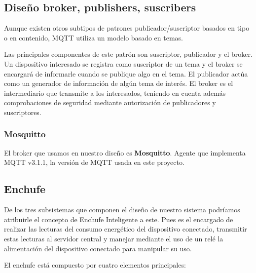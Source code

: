 \documentclass[a4paper,10pt]{article}
\begin{document}
\subsection{Diseño broker, publishers,
suscribers}\label{diseuxf1o-broker-publishers-suscribers}

Aunque existen otros subtipos de patrones publicador/suscriptor
basados en tipo o en contenido\cite{p.th.eugsterManyFacesPublish},
MQTT utiliza un modelo basado en temas.

Las principales componentes de este patrón son suscriptor, publicador
y el broker. Un dispositivo interesado se registra como suscriptor de
un tema y el broker se encargará de informarle cuando se publique algo
en el tema. El publicador actúa como un generador de información de
algún tema de interés. El broker es el intermediario que transmite a
los interesados, teniendo en cuenta además comprobaciones de seguridad
mediante autorización de publicadores y
suscriptores.\cite{al-fuqahaInternetThingsSurvey2015,hunkelerMQTTSPublishSubscribe2008}

\subsubsection{Mosquitto}\label{subsubsec:broker_mosquitto}

El broker que usamos en nuestro diseño es
\textbf{Mosquitto}\cite{EclipseMosquitto}. Agente que implementa MQTT
v3.1.1, la versión de MQTT usada en este proyecto.

\newpage

\subsection{Enchufe}\label{subsec:enchufe}

De los tres subsistemas que componen el diseño de nuestro sistema
podríamos atribuirle el concepto de Enchufe Inteligente a este. Pues
es el encargado de realizar las lecturas del consumo energético del
dispositivo conectado, transmitir estas lecturas al servidor central y
manejar mediante el uso de un relé la alimentación del dispositivo
conectado para manipular su uso.

El enchufe está compuesto por cuatro elementos principales:
\end{document}
